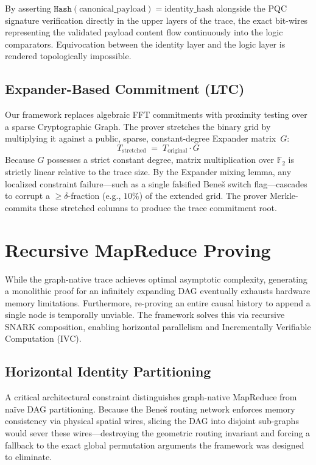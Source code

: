 \documentclass[11pt,a4paper]{article}
\begin{document}
By asserting $\texttt{Hash}(\text{canonical\_payload})
= \text{identity\_hash}$ alongside the PQC signature verification
directly in the upper layers of the trace, the exact bit-wires
representing the validated payload content flow continuously into
the logic comparators.  Equivocation between the identity layer and
the logic layer is rendered topologically impossible.

\subsection{Expander-Based Commitment (LTC)}

Our framework replaces algebraic FFT commitments with proximity
testing over a sparse Cryptographic Graph.  The prover stretches the
binary grid by multiplying it against a public, sparse,
constant-degree Expander matrix~$G$:
\[
  T_{\mathrm{stretched}} \;=\; T_{\mathrm{original}} \cdot G
\]
Because $G$ possesses a strict constant degree, matrix multiplication
over $\mathbb{F}_2$ is strictly linear relative to the trace size.
By the Expander mixing lemma, any localized constraint
failure---such as a single falsified Bene\v{s} switch
flag---cascades to corrupt a $\ge \delta$-fraction (e.g., $10\%$)
of the extended grid.  The prover Merkle-commits these stretched
columns to produce the trace commitment root.


\section{Recursive MapReduce Proving}\label{sec:recursive}

While the graph-native trace achieves optimal asymptotic complexity,
generating a monolithic proof for an infinitely expanding DAG
eventually exhausts hardware memory limitations.  Furthermore,
re-proving an entire causal history to append a single node is
temporally unviable.  The framework solves this via recursive SNARK
composition, enabling horizontal parallelism and Incrementally
Verifiable Computation (IVC).

\subsection{Horizontal Identity Partitioning}

A critical architectural constraint distinguishes graph-native
MapReduce from na\"ive DAG partitioning.  Because the Bene\v{s}
routing network enforces memory consistency via physical spatial
wires, slicing the DAG into disjoint sub-graphs would sever these
wires---destroying the geometric routing invariant and forcing a
fallback to the exact global permutation arguments the framework
was designed to eliminate.
\end{document}
